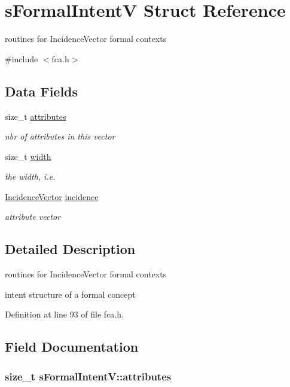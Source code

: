 \hypertarget{structsFormalIntentV}{\section{s\-Formal\-Intent\-V \-Struct \-Reference}
\label{structsFormalIntentV}
}


routines for \-Incidence\-Vector formal contexts  




{\ttfamily \#include $<$fca.\-h$>$}

\subsection*{\-Data \-Fields}
\begin{DoxyCompactItemize}
\item 
size\-\_\-t \hyperlink{structsFormalIntentV_addf2a15164915bd6dbc77d4ff48325de}{attributes}
\begin{DoxyCompactList}\small\item\em nbr of attributes in this vector \end{DoxyCompactList}\item 
size\-\_\-t \hyperlink{structsFormalIntentV_a70711ba6edc09660adb6a838ef8d1555}{width}
\begin{DoxyCompactList}\small\item\em the width, i.\-e. \end{DoxyCompactList}\item 
\hyperlink{fca_8h_aae617489ac88fff15979050721fe581f}{\-Incidence\-Vector} \hyperlink{structsFormalIntentV_af2b03b37318f9292907b0f09c599cc30}{incidence}
\begin{DoxyCompactList}\small\item\em attribute vector \end{DoxyCompactList}\end{DoxyCompactItemize}


\subsection{\-Detailed \-Description}
routines for \-Incidence\-Vector formal contexts 

intent structure of a formal concept 

\-Definition at line 93 of file fca.\-h.



\subsection{\-Field \-Documentation}
\hypertarget{structsFormalIntentV_addf2a15164915bd6dbc77d4ff48325de}{
\subsubsection[{attributes}]{\setlength{\rightskip}{0pt plus 5cm}size\-\_\-t {\bf s\-Formal\-Intent\-V\-::attributes}}}\label{structsFormalIntentV_addf2a15164915bd6dbc77d4ff48325de}



